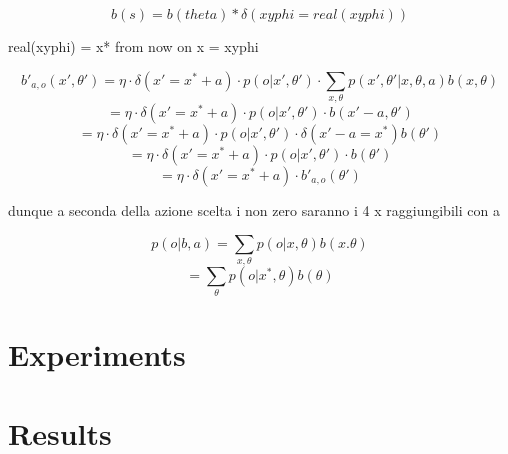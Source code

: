 \documentclass[12pt,a4paper]{article}
\begin{document}
$$b(s) = b(theta) * \delta(xyphi = real(xyphi))$$

real(xyphi) = x*
from now on x = xyphi



$$b'_{a,o}(x',\theta') = \eta \cdot \delta(x'=x^*+a) \cdot p(o|x',\theta') \cdot \sum_{x,\theta}p(x',\theta'|x,\theta,a)b(x,\theta)$$
$$ = \eta \cdot \delta(x'=x^*+a) \cdot p(o|x',\theta') \cdot b(x'-a,\theta') $$
$$ = \eta \cdot \delta(x'=x^*+a) \cdot p(o|x',\theta') \cdot \delta (x'-a = x^* )b(\theta') $$
$$ = \eta \cdot \delta(x'=x^*+a) \cdot p(o|x',\theta') \cdot b(\theta') $$
$$ = \eta \cdot \delta(x'=x^*+a) \cdot b'_{a,o}(\theta')$$

dunque a seconda della azione scelta i non zero saranno i 4 x raggiungibili con a

$$p(o|b,a) = \sum_{x,\theta}p(o|x,\theta)b(x.\theta)$$
$$ = \sum_{\theta}p(o|x^*,\theta)b(\theta)$$
\newpage
\section{Experiments}
\section{Results}




\newpage


\end{document}
